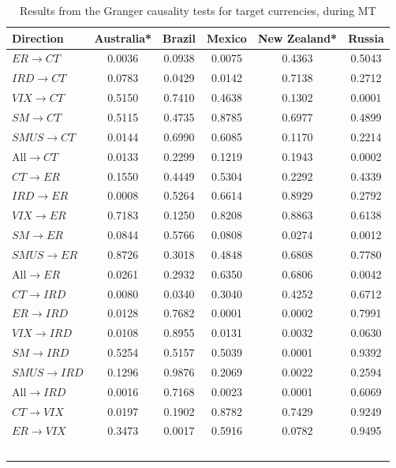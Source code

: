 \documentclass[a4paper, twoside]{templates/ociamthesis}
\begin{document}
\begin{table}[H]

\caption{\label{tab:Granger3}Results from the Granger causality tests for target currencies, during MT}
\centering
\fontsize{10}{12}\selectfont
\begin{tabular}[t]{lccccc}
\toprule
Direction & Australia* & Brazil & Mexico & New Zealand* & Russia\\
\midrule
$ER$$\rightarrow$$CT$ & 0.0036 & 0.0938 & 0.0075 & 0.4363 & 0.5043\\
$IRD$$\rightarrow$$CT$ & 0.0783 & 0.0429 & 0.0142 & 0.7138 & 0.2712\\
$VIX$$\rightarrow$$CT$ & 0.5150 & 0.7410 & 0.4638 & 0.1302 & 0.0001\\
$SM$$\rightarrow$$CT$ & 0.5115 & 0.4735 & 0.8785 & 0.6977 & 0.4899\\
$SMUS$$\rightarrow$$CT$ & 0.0144 & 0.6990 & 0.6085 & 0.1170 & 0.2214\\
All$\rightarrow$$CT$ & 0.0133 & 0.2299 & 0.1219 & 0.1943 & 0.0002\\
\addlinespace
$CT$$\rightarrow$$ER$ & 0.1550 & 0.4449 & 0.5304 & 0.2292 & 0.4339\\
$IRD$$\rightarrow$$ER$ & 0.0008 & 0.5264 & 0.6614 & 0.8929 & 0.2792\\
$VIX$$\rightarrow$$ER$ & 0.7183 & 0.1250 & 0.8208 & 0.8863 & 0.6138\\
$SM$$\rightarrow$$ER$ & 0.0844 & 0.5766 & 0.0808 & 0.0274 & 0.0012\\
$SMUS$$\rightarrow$$ER$ & 0.8726 & 0.3018 & 0.4848 & 0.6808 & 0.7780\\
All$\rightarrow$$ER$ & 0.0261 & 0.2932 & 0.6350 & 0.6806 & 0.0042\\
\addlinespace
$CT$$\rightarrow$$IRD$ & 0.0080 & 0.0340 & 0.3040 & 0.4252 & 0.6712\\
$ER$$\rightarrow$$IRD$ & 0.0128 & 0.7682 & 0.0001 & 0.0002 & 0.7991\\
$VIX$$\rightarrow$$IRD$ & 0.0108 & 0.8955 & 0.0131 & 0.0032 & 0.0630\\
$SM$$\rightarrow$$IRD$ & 0.5254 & 0.5157 & 0.5039 & 0.0001 & 0.9392\\
$SMUS$$\rightarrow$$IRD$ & 0.1296 & 0.9876 & 0.2069 & 0.0022 & 0.2594\\
All$\rightarrow$$IRD$ & 0.0016 & 0.7168 & 0.0023 & 0.0001 & 0.6069\\
\addlinespace
$CT$$\rightarrow$$VIX$ & 0.0197 & 0.1902 & 0.8782 & 0.7429 & 0.9249\\
$ER$$\rightarrow$$VIX$ & 0.3473 & 0.0017 & 0.5916 & 0.0782 & 0.9495\\
$$
\end{tabular}
\end{table}
\end{document}
